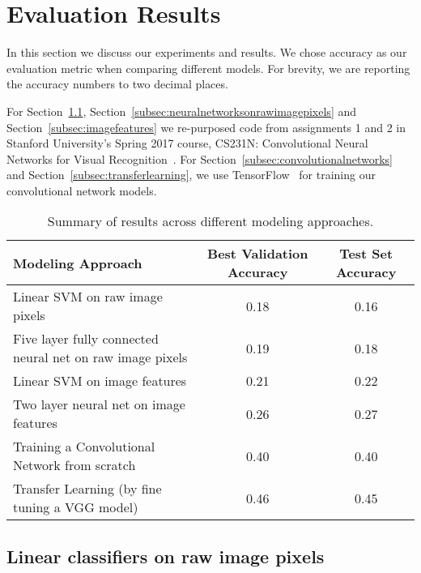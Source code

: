 \section{Evaluation Results}
\label{sec:evaluationresults}

In this section we discuss our experiments and results. We chose accuracy as our evaluation metric when comparing different models. For brevity, we are reporting the accuracy numbers to two decimal places. 

For Section~\ref{subsec:linearclassifiersonrawimagepixels}, Section~\ref{subsec:neuralnetworksonrawimagepixels} and Section~\ref{subsec:imagefeatures} we re-purposed code from assignments 1 and 2 in Stanford University's Spring 2017 course, CS231N: Convolutional Neural Networks for Visual Recognition~\cite{cs231n}. For Section~\ref{subsec:convolutionalnetworks} and Section~\ref{subsec:transferlearning}, we use TensorFlow~\cite{abadi2016tensorflow} for training our convolutional network models.

\begin{table*}[h!]
\begin{center}
\begin{tabular}{|l|c|c|}
\hline
Modeling Approach & Best Validation Accuracy & Test Set Accuracy \\
\hline\hline
Linear SVM on raw image pixels & 0.18 & 0.16 \\
Five layer fully connected neural net on raw image pixels & 0.19 & 0.18 \\
Linear SVM on image features & 0.21 & 0.22 \\
Two layer neural net on image features & 0.26 & 0.27 \\
Training a Convolutional Network from scratch  & 0.40 & 0.40 \\
Transfer Learning (by fine tuning a VGG model) & 0.46 & 0.45 \\
\hline
\end{tabular}
\end{center}
\caption{Summary of results across different modeling approaches.}
\label{table:accuracyresults}
\end{table*}

\subsection{Linear classifiers on raw image pixels}
\label{subsec:linearclassifiersonrawimagepixels}


